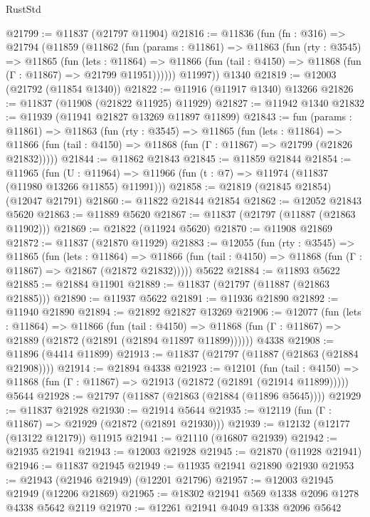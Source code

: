 \begin{lexlean}{RustStd}
\begin{coremodule}
@21799 := @11837 (@21797 @11904)
@21816 := @11836
    (fun (fn : @316) =>
    @21794
      (@11859
        (@11862
          (fun (params : @11861) =>
          @11863
            (fun (rty : @3545) =>
            @11865
              (fun (lets : @11864) =>
              @11866 (fun (tail : @4150) => @11868 (fun (Γ : @11867) => @21799 @11951))))))
        @11997))
    @1340
@21819 := @12003 (@21792 (@11854 @1340))
@21822 := @11916 (@11917 @1340) @13266
@21826 := @11837 (@11908 (@21822 @11925) @11929)
@21827 := @11942 @1340
@21832 := @11939 (@11941 @21827 @13269 @11897 @11899)
@21843 := fun (params : @11861) =>
  @11863
    (fun (rty : @3545) =>
    @11865
      (fun (lets : @11864) =>
      @11866 (fun (tail : @4150) => @11868 (fun (Γ : @11867) => @21799 (@21826 @21832)))))
@21844 := @11862 @21843
@21845 := @11859 @21844
@21854 := @11965
    (fun (U : @11964) => @11966 (fun (t : @7) => @11974 (@11837 (@11980 @13266 @11855) @11991)))
@21858 := @21819 (@21845 @21854) (@12047 @21791)
@21860 := @11822 @21844 @21854
@21862 := @12052 @21843 @5620
@21863 := @11889 @5620
@21867 := @11837 (@21797 (@11887 (@21863 @11902)))
@21869 := @21822 (@11924 @5620)
@21870 := @11908 @21869
@21872 := @11837 (@21870 @11929)
@21883 := @12055
    (fun (rty : @3545) =>
    @11865
      (fun (lets : @11864) =>
      @11866 (fun (tail : @4150) => @11868 (fun (Γ : @11867) => @21867 (@21872 @21832)))))
    @5622
@21884 := @11893 @5622
@21885 := @21884 @11901
@21889 := @11837 (@21797 (@11887 (@21863 @21885)))
@21890 := @11937 @5622
@21891 := @11936 @21890
@21892 := @11940 @21890
@21894 := @21892 @21827 @13269
@21906 := @12077
    (fun (lets : @11864) =>
    @11866
      (fun (tail : @4150) =>
      @11868 (fun (Γ : @11867) => @21889 (@21872 (@21891 (@21894 @11897 @11899))))))
    @4338
@21908 := @11896 (@4414 @11899)
@21913 := @11837 (@21797 (@11887 (@21863 (@21884 @21908))))
@21914 := @21894 @4338
@21923 := @12101
    (fun (tail : @4150) => @11868 (fun (Γ : @11867) => @21913 (@21872 (@21891 (@21914 @11899)))))
    @5644
@21928 := @21797 (@11887 (@21863 (@21884 (@11896 @5645))))
@21929 := @11837 @21928
@21930 := @21914 @5644
@21935 := @12119 (fun (Γ : @11867) => @21929 (@21872 (@21891 @21930)))
@21939 := @12132 (@12177 (@13122 @12179)) @11915
@21941 := @21110 (@16807 @21939)
@21942 := @21935 @21941
@21943 := @12003 @21928
@21945 := @21870 (@11928 @21941)
@21946 := @11837 @21945
@21949 := @11935 @21941 @21890 @21930
@21953 := @21943 (@21946 @21949) (@12201 @21796)
@21957 := @12003 @21945 @21949 (@12206 @21869)
@21965 := @18302 @21941 @569 @1338 @2096 @1278 @4338 @5642 @2119
@21970 := @12261 @21941 @4049 @1338 @2096 @5642

\end{coremodule}
\end{lexlean}

